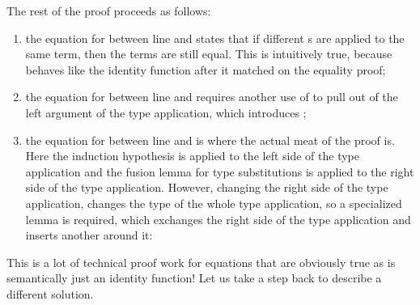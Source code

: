 \documentclass[acmsmall,anonymous,review,screen]{acmart}
\newenvironment{AgdaBlock}{%
  \vspace{\AgdaEmptySkip}%
  \AgdaNoSpaceAroundCode{}%
}{%
  \AgdaSpaceAroundCode{}
}
\begin{document}


The rest of the proof proceeds as follows:
\begin{enumerate}
\item the equation for {} between line  and  states that if
  different {\Asubst}s are applied to the same term, then the terms are still equal.
  This is intuitively true, because {\Asubst} behaves like the identity function
  after it matched on the equality proof;
\item the equation for {} between line  and  requires another
  use of {} to pull {} out of the left
  argument of the type application, which introduces {};
\item the equation for {} between line  and  is where
  the actual meat of the proof is. Here the induction hypothesis is applied to the
  left side of the type application and the fusion lemma for type substitutions
  is applied to the right side of the type application. However, changing
  the right side of the type application, changes the type of the
  whole type application, so a specialized {} lemma is required, which exchanges
  the right side of the type application and inserts another {\Asubst}
  {} around it:
  \begin{AgdaBlock}
    \SubstExamplesCongTApp
    \SubstExamplesFusionESubESubBodyProofD
  \end{AgdaBlock}
\end{enumerate}

This is a lot of technical proof work for equations that are obviously
true as {\Asubst} is semantically just an identity function!
Let us take a step back to describe a different solution.
\end{document}
